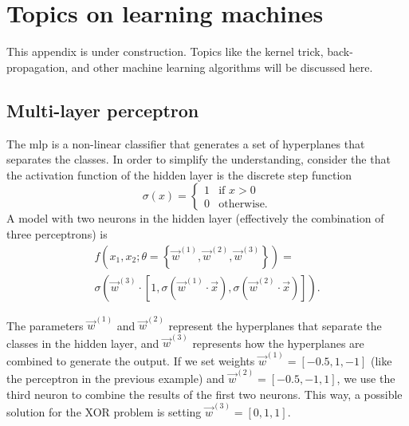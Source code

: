 \chapter{Topics on learning machines}
\label{chap:learning-machines}
\glsresetall



This appendix is under construction.  Topics like the kernel trick, back-propagation, and
other machine learning algorithms will be discussed here.

{}
\clearpage

\section{Multi-layer perceptron}
\label{sec:mlp}

The \gls{mlp} is a non-linear classifier that generates a set of hyperplanes
that separates the classes.  In order to simplify the understanding, consider the
that the activation function of the hidden layer is the discrete step function
\begin{equation*}
  \sigma(x) = \begin{cases}
    1 & \text{if } x > 0 \\
    0 & \text{otherwise.}
  \end{cases}
\end{equation*}
A model with two neurons in the hidden layer (effectively the combination of three
perceptrons) is
\begin{multline*}
  f(x_1, x_2; \theta = \left\{ \vec{w}^{(1)}, \vec{w}^{(2)}, \vec{w}^{(3)} \right\}) = \\
  \sigma\left(
    \vec{w}^{(3)} \cdot \left[1, \sigma(\vec{w}^{(1)} \cdot \vec{x}), \sigma(\vec{w}^{(2)} \cdot \vec{x})\right]
  \right)\text{.}
\end{multline*}

The parameters $\vec{w}^{(1)}$ and $\vec{w}^{(2)}$ represent the hyperplanes that separate
the classes in the hidden layer, and $\vec{w}^{(3)}$ represents how the hyperplanes are
combined to generate the output.  If we set weights $\vec{w}^{(1)} = [-0.5, 1, -1]$ (like the
perceptron in the previous example) and $\vec{w}^{(2)} = [-0.5, -1, 1]$, we use the third neuron
to combine the results of the first two neurons.  This way, a possible solution for the
XOR problem is setting $\vec{w}^{(3)} = [0, 1, 1]$.

